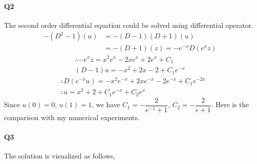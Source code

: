 \documentclass[11pt]{article}
\begin{document}
\paragraph{Q2}
The second order differential equation could be solved using differential operator.
\begin{align}
	-(D^2-1)(u)&=-(D-1)(D+1)(u)\\
	&=-(D+1)(z)=-e^{-x}D(e^{x}z)
\end{align}
\begin{align}
	\therefore -e^{x}z=x^2e^x-2xe^x+2e^x+C_1\\
	(D-1)u=-x^2+2x-2+C_1e^{-x}
\end{align}
\begin{align}
	&\therefore D(e^{-x}u)=-x^2e^{-x}+2xe^{-x}-2e^{-x}+C_1e^{-2x}\\
	&\therefore u=x^2+2+C_1e^{-x}+C_2e^{x}
\end{align}
Since $u(0)=0$, $u(1)=1$, we have $C_1=-\dfrac{2}{e^{-1}+1}$, $C_2=-\dfrac{2}{e+1}$. Here is the comparison with my numerical experiments.
\begin{figure}[H]
	\centering
\end{figure}
\paragraph{Q3}
The solution is visualized as follows,
\begin{figure}[H]
	\centering
\end{figure}
\end{document}
